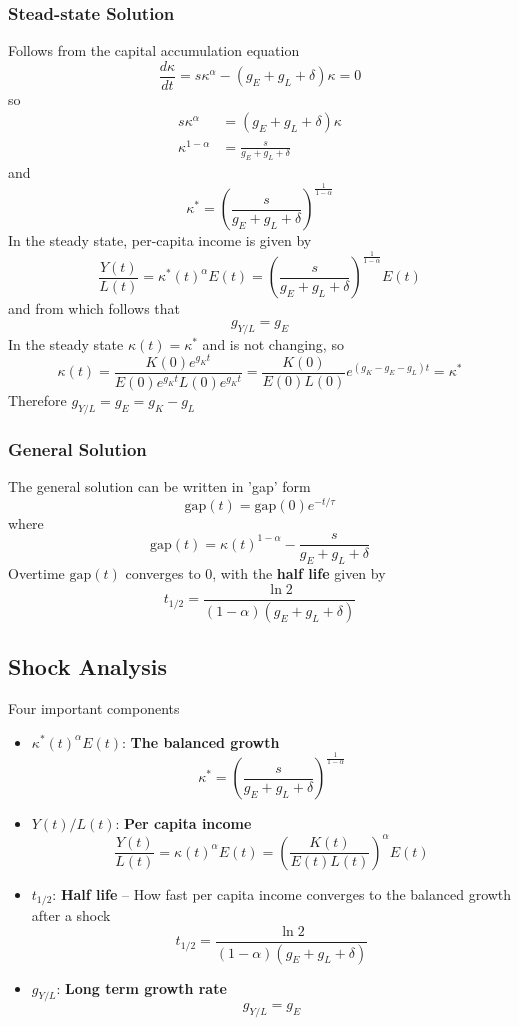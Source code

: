 \documentclass[a4paper]{article}
\begin{document}
\subsubsection*{Stead-state Solution}
Follows from the capital accumulation equation
\[ \frac{d\kappa}{dt} = s\kappa^\alpha - (g_E + g_L + \delta)\kappa = 0 \]
so \begin{align*}
    s\kappa^\alpha &= (g_E + g_L + \delta)\kappa \\
    \kappa^{1-\alpha} &= \frac{s}{g_E + g_L + \delta}
\end{align*}
and
\begin{equation*}
    \boxed{\kappa^* = (\frac{s}{g_E + g_L + \delta})^\frac{1}{1 - \alpha}}
\end{equation*}
In the steady state, per-capita income is given by
\[ \frac{Y(t)}{L(t)}  = \kappa^*(t)^\alpha E(t) = (\frac{s}{g_E + g_L + \delta})^\frac{1}{1 - \alpha}E(t) \]
and from which follows that
\[ g_{Y/L} = g_E \]
In the steady state $\kappa(t) = \kappa^*$ and is not changing, so
\[ \kappa(t) = \frac{K(0)e^{g_Kt}}{E(0)e^{g_Kt}L(0)e^{g_Kt}} 
= \frac{K(0)}{E(0)L(0)}e^{(g_K-g_E-g_L)t} = \kappa^* \]
Therefore $g_{Y/L} = g_E = g_K - g_L$

\subsubsection*{General Solution}
The general solution can be written in 'gap' form
\[ \text{gap}(t) = \text{gap}(0)e^{-t/\tau} \]
where
\[ \text{gap}(t) = \kappa(t)^{1-\alpha} - \frac{s}{g_E + g_L + \delta} \]
Overtime $\text{gap}(t)$ converges to 0, with the \textbf{half life} given by
\[ \boxed{t_{1/2} = \frac{\ln 2}{(1 - \alpha)(g_E + g_L + \delta)}} \]

\subsection{Shock Analysis}
Four important components\begin{itemize}
    \item $\kappa^*(t)^\alpha E(t)$: \textbf{The balanced growth} 
    \[\kappa^* = (\frac{s}{g_E + g_L + \delta})^\frac{1}{1 - \alpha}\]
    \item $Y(t)/L(t)$: \textbf{Per capita income}
    \[ \frac{Y(t)}{L(t)} = \kappa(t)^\alpha E(t) = (\frac{K(t)}{E(t)L(t)})^\alpha E(t) \]
    \item $t_{1/2}$: \textbf{Half life} -- How fast per capita income converges to the 
    balanced growth after a shock
    \[ t_{1/2} = \frac{\ln 2}{(1 - \alpha)(g_E + g_L + \delta)} \]
    \item $g_{Y/L}$: \textbf{Long term growth rate}
    \[ g_{Y/L} = g_E \]
\end{itemize}
\end{document}
